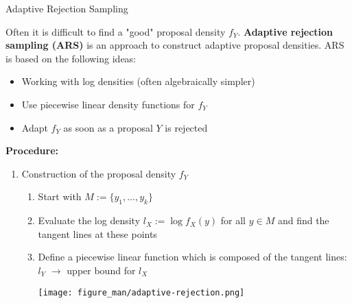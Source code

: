 \documentclass[11pt,compress,t,notes=noshow, xcolor=table]{beamer}
\begin{document}
\begin{vbframe}{Adaptive Rejection Sampling}

Often it is difficult to find a "good" proposal density $f_Y$. \textbf{Adaptive rejection sampling (ARS)} is an approach to construct adaptive proposal densities. ARS is based on the following ideas:

\begin{itemize}
\item Working with log densities (often algebraically simpler)
\item Use piecewise linear density functions for $f_Y$
\item Adapt $f_Y$ as soon as a proposal $Y$ is rejected
\end{itemize}

\framebreak

\textbf{Procedure:}
\begin{enumerate}
\item Construction of the proposal density $f_Y$
\begin{enumerate}
\item Start with $M := \{y_1,\ldots, y_k\}$
\item Evaluate the log density $l_X := \log f_X(y)$ for all $y \in M$ and find the tangent lines at these points
\item Define a piecewise linear function which is composed of the tangent lines: $l_Y$ $\to$ upper bound for $l_X$


\begin{center}
\texttt{[image: figure\_man/adaptive-rejection.png]}
\end{center}









\end{enumerate}
\end{enumerate}
\end{vbframe}
\end{document}
